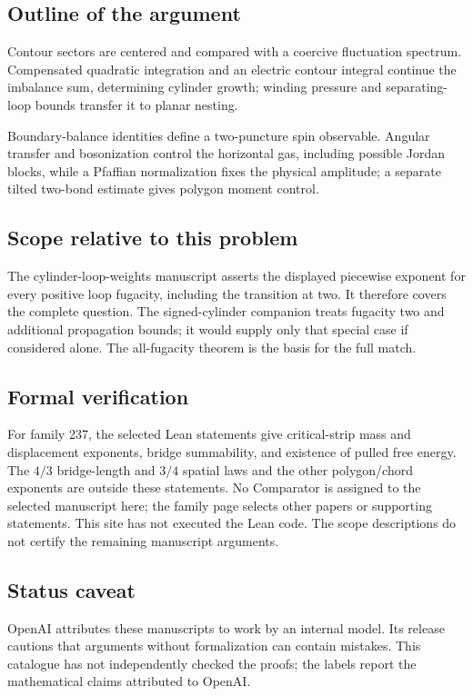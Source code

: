 \documentclass[11pt]{article}
\begin{document}
\subsection{Outline of the argument}
Contour sectors are centered and compared with a coercive fluctuation spectrum. Compensated quadratic integration and an electric contour integral continue the imbalance sum, determining cylinder growth; winding pressure and separating-loop bounds transfer it to planar nesting.

Boundary-balance identities define a two-puncture spin observable. Angular transfer and bosonization control the horizontal gas, including possible Jordan blocks, while a Pfaffian normalization fixes the physical amplitude; a separate tilted two-bond estimate gives polygon moment control.

\subsection{Scope relative to this problem}
The cylinder-loop-weights manuscript asserts the displayed piecewise exponent for every positive loop fugacity, including the transition at two. It therefore covers the complete question. The signed-cylinder companion treats fugacity two and additional propagation bounds; it would supply only that special case if considered alone. The all-fugacity theorem is the basis for the full match.

\subsection{Formal verification}
For family 237, the selected Lean statements give critical-strip mass and displacement exponents, bridge summability, and existence of pulled free energy. The $4/3$ bridge-length and $3/4$ spatial laws and the other polygon/chord exponents are outside these statements. No Comparator is assigned to the selected manuscript here; the family page selects other papers or supporting statements. This site has not executed the Lean code. The scope descriptions do not certify the remaining manuscript arguments.

\subsection{Status caveat}
OpenAI attributes these manuscripts to work by an internal model. Its release cautions that arguments without formalization can contain mistakes. This catalogue has not independently checked the proofs; the labels report the mathematical claims attributed to OpenAI.
\end{document}
